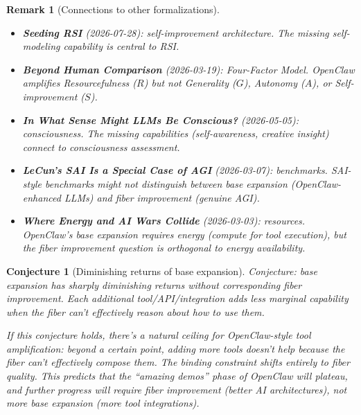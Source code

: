 \documentclass[11pt,a4paper]{article}
\newtheorem{remark}[definition]{Remark}
\newtheorem{conjecture}[definition]{Conjecture}
\begin{document}
\begin{remark}[Connections to other formalizations]
\begin{itemize}
\item \textbf{Seeding RSI} (2026-07-28): self-improvement architecture.
  The missing self-modeling capability is central to RSI.
\item \textbf{Beyond Human Comparison} (2026-03-19): Four-Factor Model.
  OpenClaw amplifies Resourcefulness ($R$) but not Generality ($G$),
  Autonomy ($A$), or Self-improvement ($S$).
\item \textbf{In What Sense Might LLMs Be Conscious?} (2026-05-05):
  consciousness. The missing capabilities (self-awareness, creative
  insight) connect to consciousness assessment.
\item \textbf{LeCun's SAI Is a Special Case of AGI} (2026-03-07):
  benchmarks. SAI-style benchmarks might not distinguish between base
  expansion (OpenClaw-enhanced LLMs) and fiber improvement (genuine AGI).
\item \textbf{Where Energy and AI Wars Collide} (2026-03-03): resources.
  OpenClaw's base expansion requires energy (compute for tool execution),
  but the fiber improvement question is orthogonal to energy availability.
\end{itemize}
\end{remark}

\begin{conjecture}[Diminishing returns of base expansion]
Conjecture: base expansion has sharply diminishing returns without
corresponding fiber improvement. Each additional tool/API/integration
adds less marginal capability when the fiber can't effectively reason
about how to use them.

If this conjecture holds, there's a natural ceiling for OpenClaw-style
tool amplification: beyond a certain point, adding more tools doesn't
help because the fiber can't effectively compose them. The binding
constraint shifts entirely to fiber quality. This predicts that the
``amazing demos'' phase of OpenClaw will plateau, and further progress
will require fiber improvement (better AI architectures), not more
base expansion (more tool integrations).
\end{conjecture}
\end{document}
